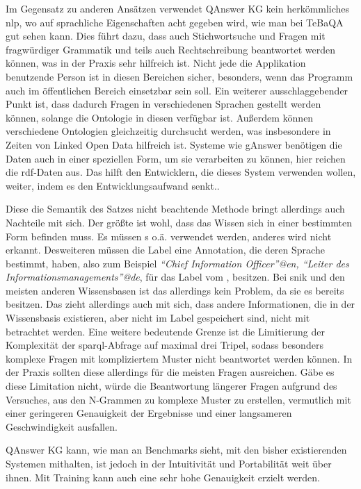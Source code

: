 Im Gegensatz zu anderen Ansätzen verwendet QAnswer KG kein herkömmliches \ac{nlp}, wo auf sprachliche Eigenschaften acht gegeben wird, wie man bei TeBaQA gut sehen kann.
Dies führt dazu, dass auch Stichwortsuche und Fragen mit fragwürdiger Grammatik und teils auch Rechtschreibung beantwortet werden können, was in der Praxis sehr hilfreich ist.
Nicht jede die Applikation benutzende Person ist in diesen Bereichen sicher, besonders, wenn das Programm auch im öffentlichen Bereich einsetzbar sein soll.
Ein weiterer ausschlaggebender Punkt ist, dass dadurch Fragen in verschiedenen Sprachen gestellt werden können, solange die Ontologie in diesen verfügbar ist.
Außerdem können verschiedene Ontologien gleichzeitig durchsucht werden, was insbesondere in Zeiten von Linked Open Data hilfreich ist.
Systeme wie gAnswer benötigen die Daten auch in einer speziellen Form, um sie verarbeiten zu können, hier reichen die \ac{rdf}-Daten aus.
Das hilft den Entwicklern, die dieses System verwenden wollen, weiter, indem es den Entwicklungsaufwand senkt..

Diese die Semantik des Satzes nicht beachtende Methode bringt allerdings auch Nachteile mit sich.
Der größte ist wohl, dass das Wissen sich in einer bestimmten Form befinden muss.
Es müssen s o.ä. verwendet werden, anderes wird nicht erkannt.
Desweiteren müssen die Label eine Annotation, die deren Sprache bestimmt, haben, also zum Beispiel \emph{\enquote{Chief Information Officer}@en, \enquote{Leiter des Informationsmanagements}@de},
für das Label vom , besitzen.
Bei \ac{snik} und den meisten anderen Wissensbasen ist das allerdings kein Problem, da sie es bereits besitzen.
Das zieht allerdings auch mit sich, dass andere Informationen, die in der Wissensbasis existieren, aber nicht im Label gespeichert sind, nicht mit betrachtet werden.
Eine weitere bedeutende Grenze ist die Limitierung der Komplexität der \ac{sparql}-Abfrage auf maximal drei Tripel, sodass besonders komplexe Fragen mit kompliziertem Muster nicht beantwortet werden können.
In der Praxis sollten diese allerdings für die meisten Fragen ausreichen.
Gäbe es diese Limitation nicht, würde die Beantwortung längerer Fragen aufgrund des Versuches, aus den N-Grammen zu komplexe Muster zu erstellen,
vermutlich mit einer geringeren Genauigkeit der Ergebnisse und einer langsameren Geschwindigkeit ausfallen.

QAnswer KG kann, wie man an Benchmarks sieht, mit den bisher existierenden Systemen mithalten, ist jedoch in der Intuitivität und Portabilität weit über ihnen.
Mit Training kann auch eine sehr hohe Genauigkeit erzielt werden.

